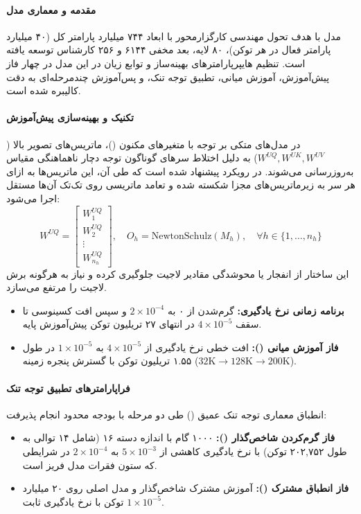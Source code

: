 \item {}

\paragraph*{مقدمه و معماری مدل}
مدل  \cite{zeng2026glm5} با هدف تحول مهندسی کارگزارمحور با ابعاد ۷۴۴ میلیارد پارامتر کل (۴۰ میلیارد پارامتر فعال در هر توکن)، ۸۰ لایه، بعد مخفی ۶۱۴۴ و ۲۵۶ کارشناس  توسعه یافته است. تنظیم هایپرپارامترهای بهینه‌ساز و توابع زیان در این مدل در چهار فاز پیش‌آموزش، آموزش میانی، تطبیق توجه تنک، و پس‌آموزش چندمرحله‌ای به دقت کالیبره شده است.

\paragraph*{تکنیک  و بهینه‌سازی پیش‌آموزش}
در مدل‌های متکی بر توجه با متغیرهای مکنون ()، ماتریس‌های تصویر بالا ($W^{UQ}, W^{UK}, W^{UV}$) به دلیل اختلاط سرهای گوناگون توجه دچار ناهماهنگی مقیاس به‌روزرسانی می‌شوند. در  رویکرد  پیشنهاد شده است که طی آن، این ماتریس‌ها به ازای هر سر به زیرماتریس‌های مجزا شکسته شده و تعامد ماتریسی روی تک‌تک آن‌ها مستقل اجرا می‌شود:
\begin{equation}
    W^{UQ} = \begin{bmatrix} W_1^{UQ} \\ W_2^{UQ} \\ \vdots \\ W_{n_h}^{UQ} \end{bmatrix}, \quad O_{h} = \text{NewtonSchulz}(M_h), \quad \forall h \in \{1, \dots, n_h\}
\end{equation}
این ساختار از انفجار یا محوشدگی مقادیر لاجیت جلوگیری کرده و نیاز به هرگونه برش لاجیت را مرتفع می‌سازد.
\begin{itemize}
    \item \textbf{برنامه زمانی نرخ یادگیری:} گرم‌شدن از ۰ به $2 \times 10^{-4}$ و سپس افت کسینوسی تا سقف $4 \times 10^{-5}$ در انتهای ۲۷ تریلیون توکن پیش‌آموزش پایه.
    \item \textbf{فاز آموزش میانی ():} افت خطی نرخ یادگیری از $4 \times 10^{-5}$ به $1 \times 10^{-5}$ در طول ۱.۵۵ تریلیون توکن با گسترش پنجره زمینه ($32\text{K} \to 128\text{K} \to 200\text{K}$).
\end{itemize}

\paragraph*{فراپارامترهای تطبیق توجه تنک }
انطباق معماری توجه تنک عمیق () طی دو مرحله با بودجه محدود انجام پذیرفت:
\begin{itemize}
    \item \textbf{فاز گرم‌کردن شاخص‌گذار ():} ۱۰۰۰ گام با اندازه دسته ۱۶ (شامل ۱۴ توالی به طول ۲۰۲,۷۵۲ توکن) با نرخ یادگیری کاهشی از $5 \times 10^{-3}$ به $2 \times 10^{-4}$ در شرایطی که ستون فقرات مدل فریز است.
    \item \textbf{فاز انطباق مشترک ():} آموزش مشترک شاخص‌گذار و مدل اصلی روی ۲۰ میلیارد توکن با نرخ یادگیری ثابت $1 \times 10^{-5}$.
\end{itemize}

